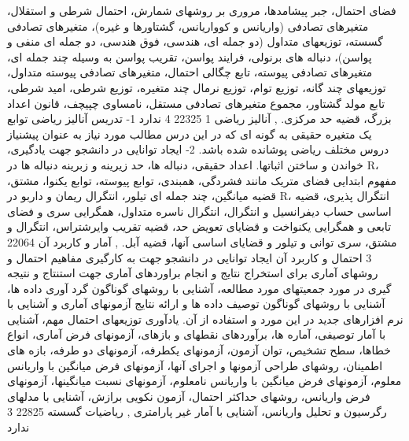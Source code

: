 \documentclass[class=article, crop=false]{standalone}
\begin{document}
{{{{        }}{{
            فضای احتمال، جبر پیشامدها، مروری بر روشهای شمارش، احتمال شرطی و استقلال، متغیرهای تصادفی (واریانس و کوواریانس، گشتاورها و غیره)، متغیرهای تصادفی گسسته، توزیعهای متداول (دو جمله ای، هندسی، فوق هندسی، دو جمله ای منفی و پواسن)، دنباله های برنولی، فرایند پواسن، تقریب پواسن به وسیله چند جمله ای، متغیرهای تصادفی پیوسته، تابع چگالی احتمال، متغیرهای تصادفی پیوسته متداول، توزیعهای چند گانه، توزیع توام، توزیع نرمال چند متغیره، توزیع شرطی، امید شرطی، تابع مولد گشتاور، مجموع متغیرهای تصادفی مستقل، نامساوی چپیچف، قانون اعداد بزرگ، قضیه حد مرکزی.
        }}
        },{{
            آنالیز ریاضی 1
        }{
            22325
        }{
            4
        }{
            ندارد
        }{{
            1- تدریس آنالیز ریاضی توابع یک متغیره حقیقی به گونه ای که در این درس مطالب مورد نیاز به عنوان پیشنیاز دروس مختلف ریاضی پوشانده شده باشد. 2- ایجاد توانایی در دانشجو جهت یادگیری، خواندن و ساختن اثباتها.
        }}{{
            اعداد حقیقی، دنباله ها، حد زیرینه و زبرینه دنباله ها در R، مفهوم ابتدایی فضای متریک مانند فشردگی، همبندی، توابع پیوسته، توابع یکنوا، مشتق، قضیه میانگین، چند جمله ای تیلور، انتگرال ریمان و داربو در R، انتگرال پذیری، قضیه اساسی حساب دیفرانسیل و انتگرال، انتگرال ناسره متداول، همگرایی سری و فضای تابعی و همگرایی یکنواخت و قضایای تعویض حد، قضیه تقریب وایرشتراس، انتگرال و مشتق، سری توانی و تیلور و قضایای اساسی آنها، قضیه آبل.
        }}
        },{{
            آمار و کاربرد آن
        }{
            22064
        }{
            3
        }{
            احتمال و کاربرد آن
        }{{
            ایجاد توانایی در دانشجو جهت به کارگیری مفاهیم احتمال و روشهای آماری برای استخراج نتایج و انجام براوردهای آماری جهت استنتاج و نتیجه گیری در مورد جمعیتهای مورد مطالعه، آشنایی با روشهای گوناگون گرد آوری داده ها، آشنایی با روشهای گوناگون توصیف داده ها و ارائه نتایج آزمونهای آماری و آشنایی با نرم افزارهای جدید در این مورد و استفاده از آن.
        }}{{
            یادآوری توزیعهای احتمال مهم، آشنایی با آمار توصیفی، آماره ها، برآوردهای نقطهای و بازهای، آزمونهای فرض آماری، انواع خطاها، سطح تشخیص، توان آزمون، آزمونهای یکطرفه، آزمونهای دو طرفه، بازه های اطمینان، روشهای طراحی آزمونها و اجرای آنها، آزمونهای فرض میانگین با واریانس معلوم، آزمونهای فرض میانگین با واریانس نامعلوم، آزمونهای نسبت میانگینها، آزمونهای فرض واریانس، روشهای حداکثر احتمال، آزمون نکویی برازش، آشنایی با مدلهای رگرسیون و تحلیل واریانس، آشنایی با آمار غیر پارامتری
        }}
        },{{
            ریاضیات گسسته
        }{
            22825
        }{
            3
        }{
            ندارد
        }{}{{
}}}}
\end{document}
